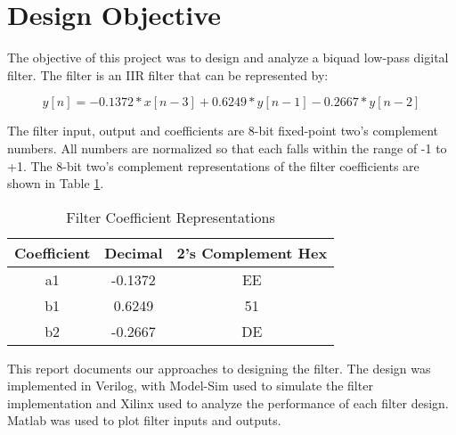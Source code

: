 \section*{Design Objective}
The objective of this project was to design and analyze a biquad low-pass digital filter. The filter is an IIR filter that can be represented by:

\begin{equation}
y[n] = -0.1372*x[n-3] + 0.6249*y[n-1] - 0.2667*y[n-2]
\end{equation}
\label{eq:filteq}

The filter input, output and coefficients are 8-bit fixed-point two's complement numbers. All numbers are normalized so that each falls within the range of -1 to +1. The 8-bit two's complement representations of the filter coefficients are shown in Table \ref{tab:filtcoeff}.

\begin{table}[bh]
\centering
\begin{tabular}{c|c|c}
Coefficient & Decimal & 2's Complement Hex \\
\hline
a1 & -0.1372 & EE \\
\hline
b1 & 0.6249 & 51 \\
\hline
b2 & -0.2667 & DE \\
\end{tabular}  
\caption{Filter Coefficient Representations}
\label{tab:filtcoeff}
\end{table}

This report documents our approaches to designing the filter. The design was implemented in Verilog, with Model-Sim used to simulate the filter implementation and Xilinx used to analyze the performance of each filter design. Matlab was used to plot filter inputs and outputs.


